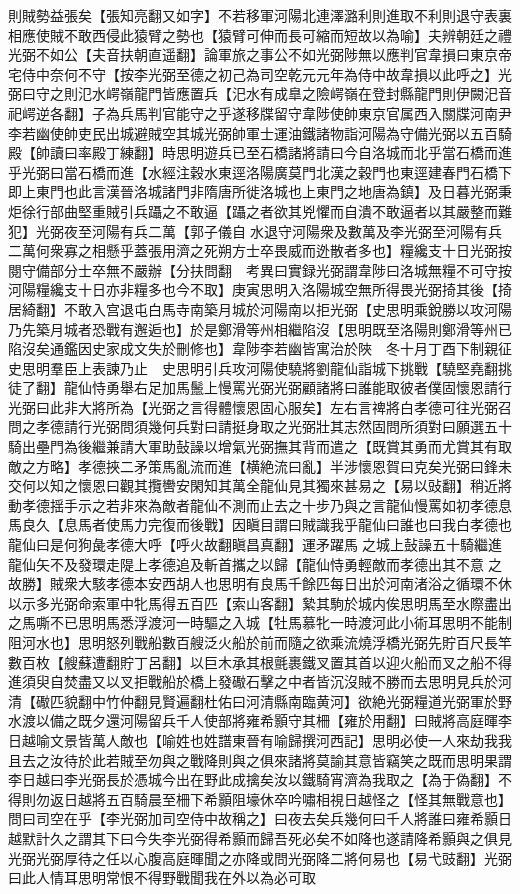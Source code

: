 則賊勢益張矣【張知亮翻又如字】不若移軍河陽北連澤潞利則進取不利則退守表裏相應使賊不敢西侵此猿臂之勢也【猿臂可伸而長可縮而短故以為喻】夫辨朝廷之禮光弼不如公【夫音扶朝直遥翻】論軍旅之事公不如光弼陟無以應判官韋損曰東京帝宅侍中奈何不守【按李光弼至德之初己為司空乾元元年為侍中故韋損以此呼之】光弼曰守之則氾水崿嶺龍門皆應置兵【汜水有成臯之險崿嶺在登封縣龍門則伊闕汜音祀崿逆各翻】子為兵馬判官能守之乎遂移牒留守韋陟使帥東京官属西入關牒河南尹李若幽使帥吏民出城避賊空其城光弼帥軍士運油鐵諸物詣河陽為守備光弼以五百騎殿【帥讀曰率殿丁練翻】時思明遊兵已至石橋諸將請曰今自洛城而北乎當石橋而進乎光弼曰當石橋而進【水經注穀水東逕洛陽廣莫門北漢之穀門也東逕建春門石橋下即上東門也此言漢晉洛城諸門非隋唐所徙洛城也上東門之地唐為鎮】及日暮光弼秉炬徐行部曲堅重賊引兵躡之不敢逼【躡之者欲其兇懼而自潰不敢逼者以其嚴整而難犯】光弼夜至河陽有兵二萬【郭子儀自水退守河陽衆及數萬及李光弼至河陽有兵二萬何衆寡之相懸乎蓋張用濟之死朔方士卒畏威而迯散者多也】糧纔支十日光弼按閱守備部分士卒無不嚴辦【分扶問翻　考異曰實録光弼謂韋陟曰洛城無糧不可守按河陽糧纔支十日亦非糧多也今不取】庚寅思明入洛陽城空無所得畏光弼掎其後【掎居綺翻】不敢入宫退屯白馬寺南築月城於河陽南以拒光弼【史思明乘銳勝以攻河陽乃先築月城者恐戰有邂逅也】於是鄭滑等州相繼陷沒【思明既至洛陽則鄭滑等州已陷沒矣通鑑因史家成文失於刪修也】韋陟李若幽皆寓治於陜　冬十月丁酉下制親征史思明羣臣上表諫乃止　史思明引兵攻河陽使驍將劉龍仙詣城下挑戰【驍堅堯翻挑徒了翻】龍仙恃勇舉右足加馬鬛上慢罵光弼光弼顧諸將曰誰能取彼者僕固懷恩請行光弼曰此非大將所為【光弼之言得體懷恩固心服矣】左右言禆將白孝德可往光弼召問之孝德請行光弼問須幾何兵對曰請挺身取之光弼壯其志然固問所須對曰願選五十騎出壘門為後繼兼請大軍助鼔譟以增氣光弼撫其背而遣之【既賞其勇而尤賞其有取敵之方略】孝德挾二矛策馬亂流而進【横絶流曰亂】半涉懷恩賀曰克矣光弼曰鋒未交何以知之懷恩曰觀其攬轡安閑知其萬全龍仙見其獨來甚易之【易以䜴翻】稍近將動孝德揺手示之若非來為敵者龍仙不測而止去之十步乃與之言龍仙慢罵如初孝德息馬良久【息馬者使馬力完復而後戰】因瞋目謂曰賊識我乎龍仙曰誰也曰我白孝德也龍仙曰是何狗彘孝德大呼【呼火故翻瞋昌真翻】運矛躍馬之城上鼔譟五十騎繼進龍仙矢不及發環走隄上孝德追及斬首攜之以歸【龍仙恃勇輕敵而孝德出其不意之故勝】賊衆大駭孝德本安西胡人也思明有良馬千餘匹每日出於河南渚浴之循環不休以示多光弼命索軍中牝馬得五百匹【索山客翻】縶其駒於城内俟思明馬至水際盡出之馬嘶不已思明馬悉浮渡河一時驅之入城【牡馬慕牝一時渡河此小術耳思明不能制阻河水也】思明怒列戰船數百艘泛火船於前而隨之欲乘流燒浮橋光弼先貯百尺長竿數百枚【艘蘇遭翻貯丁呂翻】以巨木承其根氈裹鐵叉置其首以迎火船而叉之船不得進須臾自焚盡又以叉拒戰船於橋上發礮石擊之中者皆沉沒賊不勝而去思明見兵於河清【礮匹貌翻中竹仲翻見賢遍翻杜佑曰河清縣南臨黄河】欲絶光弼糧道光弼軍於野水渡以備之既夕還河陽留兵千人使部將雍希顥守其柵【雍於用翻】曰賊將高庭暉李日越喻文景皆萬人敵也【喻姓也姓譜東晉有喻歸撰河西記】思明必使一人來劫我我且去之汝待於此若賊至勿與之戰降則與之俱來諸將莫諭其意皆竊笑之既而思明果謂李日越曰李光弼長於憑城今出在野此成擒矣汝以鐵騎宵濟為我取之【為于偽翻】不得則勿返日越將五百騎晨至柵下希顥阻壕休卒吟嘯相視日越怪之【怪其無戰意也】問曰司空在乎【李光弼加司空侍中故稱之】曰夜去矣兵幾何曰千人將誰曰雍希顥日越默計久之謂其下曰今失李光弼得希顥而歸吾死必矣不如降也遂請降希顥與之俱見光弼光弼厚待之任以心腹高庭暉聞之亦降或問光弼降二將何易也【易弋豉翻】光弼曰此人情耳思明常恨不得野戰聞我在外以為必可取